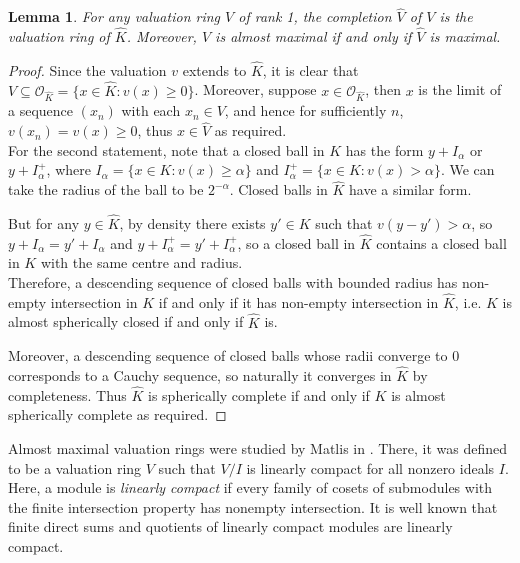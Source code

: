 \documentclass[12pt]{amsart}
\newtheorem{lemma}[theorem]{Lemma}
\theoremstyle{plain}
\begin{document}
\begin{lemma}\label{lem: maximal completion}
For any valuation ring $V$ of rank 1, the completion $\widehat{V}$ of $V$ is the valuation ring of $\widehat{K}$. Moreover, $V$ is almost maximal if and only if $\widehat{V}$ is maximal.
\end{lemma}

\begin{proof}

Since the valuation $v$ extends to $\widehat{K}$, it is clear that $V\subseteq\mathcal{O}_{\widehat{K}}=\{x\in\widehat{K}:v(x)\geq 0\}$. Moreover, suppose $x\in\mathcal{O}_{\widehat{K}}$, then $x$ is the limit of a sequence $(x_n)$ with each $x_n\in V$, and hence for sufficiently $n$, $v(x_n)=v(x)\geq 0$, thus $x\in\widehat{V}$ as required.\\

\noindent For the second statement, note that a closed ball in $K$ has the form $y+I_\alpha$ or $y+I_{\alpha}^+$, where $I_{\alpha}=\{x\in K:v(x)\geq\alpha\}$ and $I_{\alpha}^+=\{x\in K:v(x)>\alpha\}$. We can take the radius of the ball to be $2^{-\alpha}$. Closed balls in $\widehat{K}$ have a similar form.

But for any $y\in\widehat{K}$, by density there exists $y'\in K$ such that $v(y-y')>\alpha$, so $y+I_{\alpha}=y'+I_{\alpha}$ and $y+I_{\alpha}^+=y'+I_{\alpha}^+$, so a closed ball in $\widehat{K}$ contains a closed ball in $K$ with the same centre and radius.\\

\noindent Therefore, a descending sequence of closed balls with bounded radius has non-empty intersection in $K$ if and only if it has non-empty intersection in $\widehat{K}$, i.e. $K$ is almost spherically closed if and only if $\widehat{K}$ is. 

Moreover, a descending sequence of closed balls whose radii converge to 0 corresponds to a Cauchy sequence, so naturally it converges in $\widehat{K}$ by completeness. Thus $\widehat{K}$ is spherically complete if and only if $K$ is almost spherically complete as required.\end{proof}

\noindent Almost maximal valuation rings were studied by Matlis in \cite{MatlisPruefer}. There, it was defined to be a valuation ring $V$ such that $V/I$ is linearly compact for all nonzero ideals $I$. Here, a module is \emph{linearly compact} if every family of cosets of submodules with the finite intersection property has nonempty intersection. It is well known that finite direct sums and quotients of linearly compact modules are
linearly compact.
\end{document}
